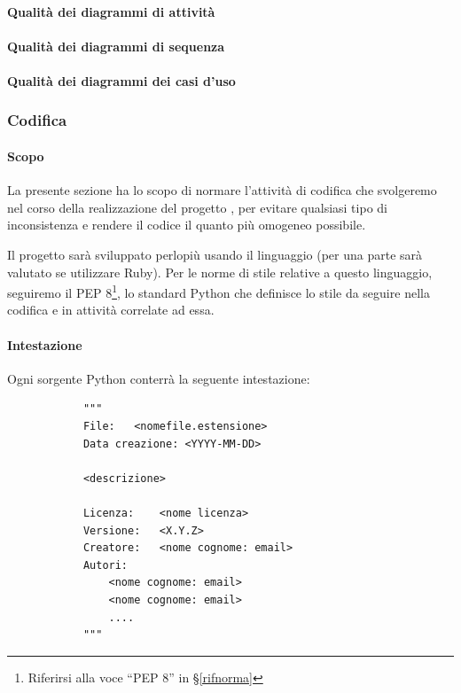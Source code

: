 		\paragraph{Qualità dei diagrammi di attività} %

		\paragraph{Qualità dei diagrammi di sequenza} %

		\paragraph{Qualità dei diagrammi dei casi d'uso} %



		\subsubsection{Codifica}\label{PP:Sviluppo:Codifica}

		\paragraph{Scopo}
		La presente sezione ha lo scopo di normare l'attività di codifica che svolgeremo nel corso della realizzazione del progetto \progetto, per
		evitare qualsiasi tipo di inconsistenza e rendere il codice il quanto più omogeneo possibile.

		Il progetto sarà sviluppato perlopiù usando il linguaggio  (per una parte sarà valutato se utilizzare Ruby).
		Per le norme di stile relative a questo linguaggio, seguiremo il PEP 8\footnote{Riferirsi alla voce ``PEP 8'' in \S\ref{rifnorma}},
		lo standard Python che definisce lo stile da seguire nella codifica e in attività correlate ad essa.

        \paragraph{Intestazione} %
		Ogni sorgente Python conterrà la seguente intestazione:
		\begin{verbatim}
			"""
			File:	<nomefile.estensione>
			Data creazione: <YYYY-MM-DD>

			<descrizione>

			Licenza:	<nome licenza>
			Versione:	<X.Y.Z>
			Creatore:	<nome cognome: email>
			Autori:
				<nome cognome: email>
				<nome cognome: email>
				....
			"""
		\end{verbatim}

